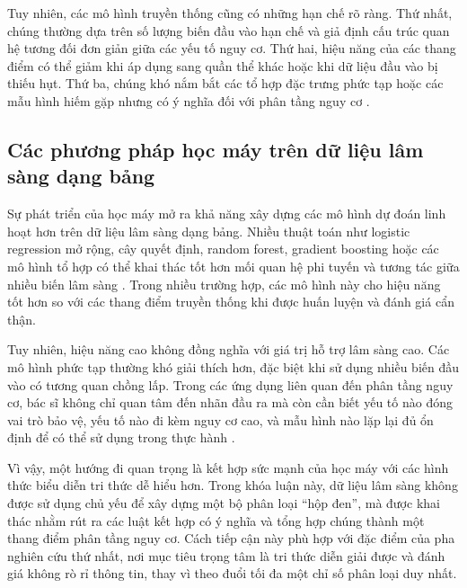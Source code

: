 \blocksep

Tuy nhiên, các mô hình truyền thống cũng có những hạn chế rõ ràng. Thứ nhất, chúng thường dựa trên số lượng biến đầu vào hạn chế và giả định cấu trúc quan hệ tương đối đơn giản giữa các yếu tố nguy cơ. Thứ hai, hiệu năng của các thang điểm có thể giảm khi áp dụng sang quần thể khác hoặc khi dữ liệu đầu vào bị thiếu hụt. Thứ ba, chúng khó nắm bắt các tổ hợp đặc trưng phức tạp hoặc các mẫu hình hiếm gặp nhưng có ý nghĩa đối với phân tầng nguy cơ \cite{Krittanawong2017}.

\blocksep

\subsection{Các phương pháp học máy trên dữ liệu lâm sàng dạng bảng}

\blocksep

Sự phát triển của học máy mở ra khả năng xây dựng các mô hình dự đoán linh hoạt hơn trên dữ liệu lâm sàng dạng bảng. Nhiều thuật toán như logistic regression mở rộng, cây quyết định, random forest, gradient boosting hoặc các mô hình tổ hợp có thể khai thác tốt hơn mối quan hệ phi tuyến và tương tác giữa nhiều biến lâm sàng \cite{Krittanawong2017}. Trong nhiều trường hợp, các mô hình này cho hiệu năng tốt hơn so với các thang điểm truyền thống khi được huấn luyện và đánh giá cẩn thận.

\blocksep

Tuy nhiên, hiệu năng cao không đồng nghĩa với giá trị hỗ trợ lâm sàng cao. Các mô hình phức tạp thường khó giải thích hơn, đặc biệt khi sử dụng nhiều biến đầu vào có tương quan chồng lấp. Trong các ứng dụng liên quan đến phân tầng nguy cơ, bác sĩ không chỉ quan tâm đến nhãn đầu ra mà còn cần biết yếu tố nào đóng vai trò bảo vệ, yếu tố nào đi kèm nguy cơ cao, và mẫu hình nào lặp lại đủ ổn định để có thể sử dụng trong thực hành \cite{Lipton2018, Rudin2019}.

\blocksep

Vì vậy, một hướng đi quan trọng là kết hợp sức mạnh của học máy với các hình thức biểu diễn tri thức dễ hiểu hơn. Trong khóa luận này, dữ liệu lâm sàng không được sử dụng chủ yếu để xây dựng một bộ phân loại “hộp đen”, mà được khai thác nhằm rút ra các luật kết hợp có ý nghĩa và tổng hợp chúng thành một thang điểm phân tầng nguy cơ. Cách tiếp cận này phù hợp với đặc điểm của pha nghiên cứu thứ nhất, nơi mục tiêu trọng tâm là tri thức diễn giải được và đánh giá không rò rỉ thông tin, thay vì theo đuổi tối đa một chỉ số phân loại duy nhất.

